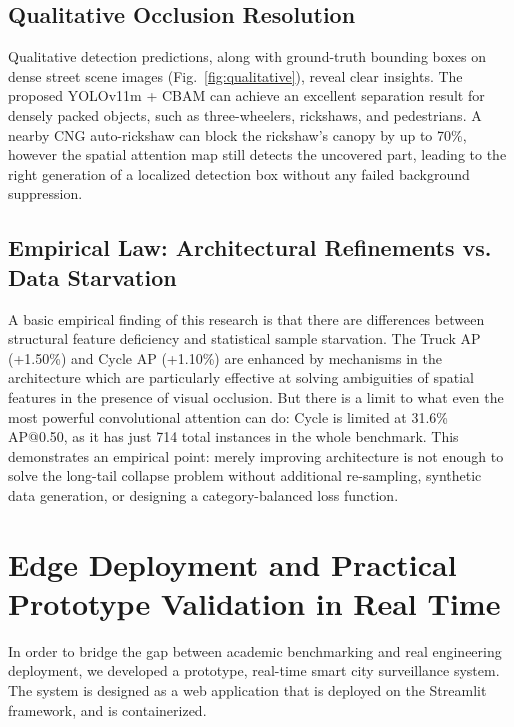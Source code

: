 \documentclass[pdflatex,sn-mathphys]{sn-jnl}
\begin{document}
\subsection{Qualitative Occlusion Resolution}
Qualitative detection predictions, along with ground-truth bounding boxes on dense street scene images (Fig.~\ref{fig:qualitative}), reveal clear insights. The proposed YOLOv11m + CBAM can achieve an excellent separation result for densely packed objects, such as three-wheelers, rickshaws, and pedestrians. A nearby CNG auto-rickshaw can block the rickshaw's canopy by up to 70\%, however the spatial attention map still detects the uncovered part, leading to the right generation of a localized detection box without any failed background suppression.

\subsection{Empirical Law: Architectural Refinements vs. Data Starvation}
A basic empirical finding of this research is that there are differences between structural feature deficiency and statistical sample starvation. The Truck AP (+1.50\%) and Cycle AP (+1.10\%) are enhanced by mechanisms in the architecture which are particularly effective at solving ambiguities of spatial features in the presence of visual occlusion. But there is a limit to what even the most powerful convolutional attention can do: Cycle is limited at 31.6\% AP@0.50, as it has just 714 total instances in the whole benchmark. This demonstrates an empirical point: merely improving architecture is not enough to solve the long-tail collapse problem without additional re-sampling, synthetic data generation, or designing a category-balanced loss function.

\section{Edge Deployment and Practical Prototype Validation in Real Time}\label{sec:deployment}

In order to bridge the gap between academic benchmarking and real engineering deployment, we developed a prototype, real-time smart city surveillance system. The system is designed as a web application that is deployed on the Streamlit framework, and is containerized.
\end{document}
